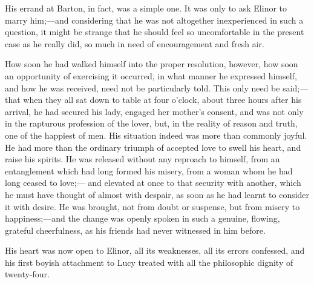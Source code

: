 \documentclass{article}
\begin{document}
His errand at Barton, in fact, was a simple one.
It was only to ask Elinor to marry him;---and considering
that he was not altogether inexperienced in such a question,
it might be strange that he should feel so uncomfortable
in the present case as he really did, so much in need of
encouragement and fresh air.

How soon he had walked himself into the proper
resolution, however, how soon an opportunity of exercising
it occurred, in what manner he expressed himself,
and how he was received, need not be particularly told.
This only need be said;---that when they all sat down to
table at four o'clock, about three hours after his arrival,
he had secured his lady, engaged her mother's consent,
and was not only in the rapturous profession of
the lover, but, in the reality of reason and truth,
one of the happiest of men.  His situation indeed was
more than commonly joyful.  He had more than the ordinary
triumph of accepted love to swell his heart, and raise
his spirits.  He was released without any reproach
to himself, from an entanglement which had long formed
his misery, from a woman whom he had long ceased to love;---%
and elevated at once to that security with another,
which he must have thought of almost with despair,
as soon as he had learnt to consider it with desire.
He was brought, not from doubt or suspense, but from
misery to happiness;---and the change was openly spoken
in such a genuine, flowing, grateful cheerfulness,
as his friends had never witnessed in him before.

His heart was now open to Elinor, all its weaknesses,
all its errors confessed, and his first boyish attachment
to Lucy treated with all the philosophic dignity of twenty-four.
\end{document}

